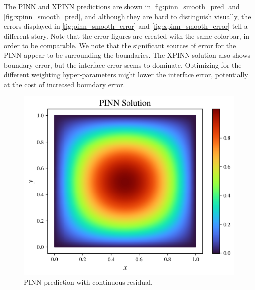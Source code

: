 The PINN and XPINN predictions are shown in \autoref{fig:pinn_smooth_pred} and \autoref{fig:xpinn_smooth_pred}, and although they are hard to distinguish visually, the errors displayed in \autoref{fig:pinn_smooth_error} and \autoref{fig:xpinn_smooth_error} tell a different story.
Note that the error figures are created with the same colorbar, in order to be comparable.
We note that the significant sources of error for the PINN appear to be surrounding the boundaries.
The XPINN solution also shows boundary error, but the interface error seems to dominate.
Optimizing for the different weighting hyper-parameters might lower the interface error, potentially at the cost of increased boundary error.

\begin{figure}[h]
    \centering
    \includegraphics[width=\linewidth]{Project1XPINNs/figures/Poisson/smooth_single_Poisson_solution.png}
    \caption{PINN prediction with continuous residual.}
    \label{fig:pinn_smooth_pred}
\end{figure}

